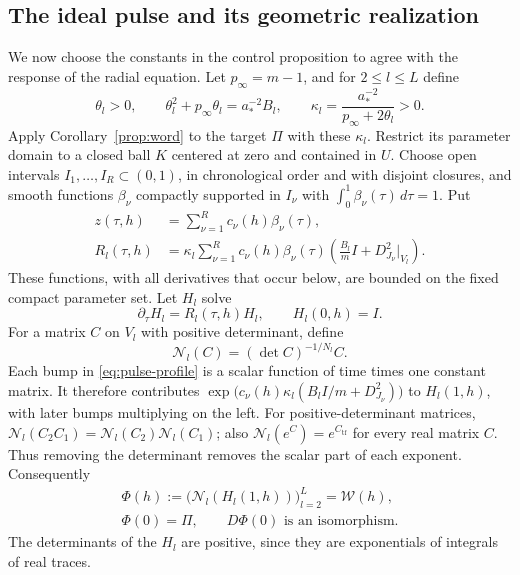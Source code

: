 \subsection{The ideal pulse and its geometric realization}
We now choose the constants in the control proposition to agree with
the response of the radial equation.  Let \(p_\infty=m-1\), and
for \(2\leq l\leq L\) define
\begin{equation}
 \theta_l>0,\qquad
 \theta_l^2+p_\infty\theta_l=a_*^{-2}B_l,\qquad
 \kappa_l=\frac{a_*^{-2}}{p_\infty+2\theta_l}>0.
 \label{eq:round-root}
\end{equation}
Apply Corollary~\ref{prop:word} to the target \(\Pi\) with these \(\kappa_l\).
Restrict its parameter domain to a closed ball \(K\) centered at
zero and contained in \(U\).  Choose open intervals
\(I_1,\ldots,I_R\subset(0,1)\), in chronological order and with
disjoint closures, and smooth functions \(\beta_\nu\) compactly
supported in \(I_\nu\) with
\(\int_0^1\beta_\nu(\tau)\,d\tau=1\).  Put
\begin{align}
 z(\tau,h)&=\sum_{\nu=1}^{R}c_\nu(h)\beta_\nu(\tau),\nonumber\\
 R_l(\tau,h)&=\kappa_l\sum_{\nu=1}^{R}
   c_\nu(h)\beta_\nu(\tau)
   \left(\frac{B_l}{m}I+D_{J_\nu}^2|_{V_l}\right).
 \label{eq:pulse-profile}
\end{align}
These functions, with all derivatives that occur below, are bounded
on the fixed compact parameter set.  Let \(H_l\) solve
\begin{equation}
 \partial_\tau H_l=R_l(\tau,h)H_l,\qquad H_l(0,h)=I.
 \label{eq:ideal-pulse}
\end{equation}
For a matrix \(C\) on \(V_l\) with positive determinant, define
\[
 \mathcal N_l(C)=(\det C)^{-1/N_l}C.
\]
Each bump in \eqref{eq:pulse-profile} is a scalar function of time
times one constant matrix.  It therefore contributes
\(\exp\bigl(c_\nu(h)\kappa_l(B_lI/m+D_{J_\nu}^2)\bigr)\) to
\(H_l(1,h)\), with later bumps multiplying on the left.  For
positive-determinant matrices,
\(\mathcal N_l(C_2C_1)=\mathcal N_l(C_2)\mathcal N_l(C_1)\);
also \(\mathcal N_l(e^C)=e^{C_{\mathrm{tf}}}\) for every real
matrix \(C\).  Thus removing the determinant removes the scalar
part of each exponent.  Consequently
\begin{equation}
 \begin{gathered}
 \Phi(h):=\bigl(\mathcal N_l(H_l(1,h))\bigr)_{l=2}^{L}
          =\mathcal W(h),\\
 \Phi(0)=\Pi,\qquad D\Phi(0)\text{ is an isomorphism}.
 \end{gathered}
 \label{eq:ideal-word}
\end{equation}
The determinants of the \(H_l\) are positive, since they are
exponentials of integrals of real traces.


